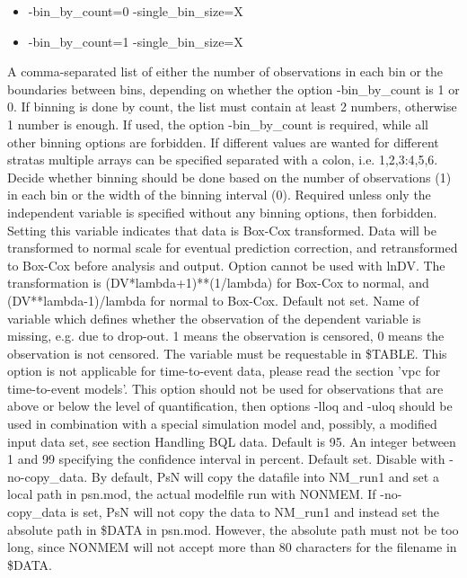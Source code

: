 \begin{optionlist}
\begin{itemize}
	\item -bin\_by\_count=0 -single\_bin\_size=X
	\item -bin\_by\_count=1 -single\_bin\_size=X
\end{itemize}
A comma-separated list of either the number of observations in each bin or the boundaries between bins, depending on whether the option 
-bin\_by\_count is 1 or 0. If binning is done by count, the list must contain at least 2 numbers, otherwise 1 number is enough.
If used, the option -bin\_by\_count is required, while all other binning options are forbidden. If different values are wanted for
different stratas multiple arrays can be specified separated with a colon, i.e. 1,2,3:4,5,6.
\nextopt
{}
Decide whether binning should be done based on the number of observations (1) in each bin or the width of the binning interval (0).
Required unless only the independent variable is specified without any binning options, then forbidden.
\nextopt
{}
Setting this variable indicates that data is Box-Cox transformed. Data will be transformed to normal scale for eventual prediction correction, and retransformed to Box-Cox before analysis and output. Option cannot be used with lnDV. The transformation is (DV*lambda+1)**(1/lambda) for Box-Cox to normal, and (DV**lambda-1)/lambda for normal to Box-Cox. 
\nextopt
{}
Default not set. Name of variable which defines whether the observation of the dependent variable is missing, e.g. due to drop-out. 1 means the observation is censored, 0 means the observation is not censored. The variable must be requestable in \$TABLE. This option is not applicable for time-to-event data, please read the section 'vpc for time-to-event models'. This option should not be used for observations that are above or below the level of quantification, then options \mbox{-lloq} and -uloq should be used in combination with a special simulation model and, possibly, a modified input data set, see section Handling BQL data.  
\nextopt
{}
Default is 95. An integer between 1 and 99 specifying the confidence interval in percent.
\nextopt
{}
Default set. Disable with -no-copy\_data. By default, PsN will copy the datafile into NM\_run1 and set a local path in psn.mod, the actual modelfile run with NONMEM. If -no-copy\_data is set, PsN will not copy the data to NM\_run1 and instead set the absolute path in \$DATA in psn.mod. However, 
the absolute path must not be too long, since NONMEM will not accept more than 80 characters for the filename in \$DATA.  

\end{optionlist}
